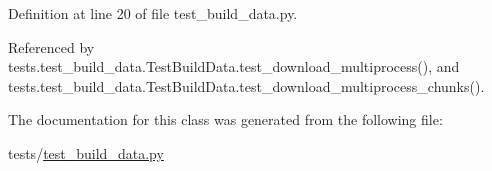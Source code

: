 Definition at line 20 of file test\+\_\+build\+\_\+data.\+py.



Referenced by tests.\+test\+\_\+build\+\_\+data.\+Test\+Build\+Data.\+test\+\_\+download\+\_\+multiprocess(), and tests.\+test\+\_\+build\+\_\+data.\+Test\+Build\+Data.\+test\+\_\+download\+\_\+multiprocess\+\_\+chunks().



The documentation for this class was generated from the following file\+:\begin{DoxyCompactItemize}
\item 
tests/\hyperlink{test__build__data_8py}{test\+\_\+build\+\_\+data.\+py}\end{DoxyCompactItemize}
